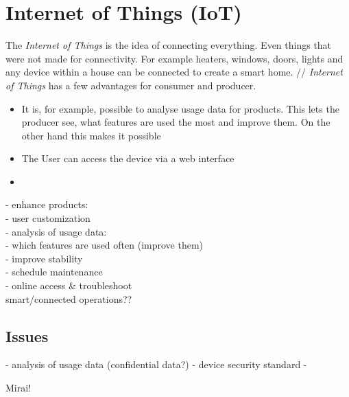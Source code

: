 \chapter{Internet of Things (IoT)}

The \textit{Internet of Things} is the idea of connecting everything. Even things that were not made for connectivity. For example heaters, windows, doors, lights and any device within a house can be connected to create a smart home. //
\textit{Internet of Things} has a few advantages for consumer and producer.
\begin{itemize}
	 \item It is, for example, possible to analyse usage data for products. This lets the producer see, what features are used the most and improve them. On the other hand this makes it possible 
	 \item The User can access the device via a web interface 
	 \item 
\end{itemize}
- enhance products: \\
- user customization \\
- analysis of usage data: \\
- which features are used often (improve them) \\
- improve stability \\
- schedule maintenance \\
- online access \& troubleshoot \\

smart/connected operations??



\section{Issues}
- analysis of usage data (confidential data?)
- device security standard
- 

Mirai!